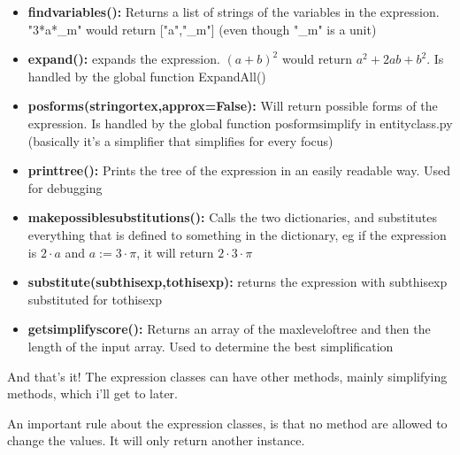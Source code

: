 \documentclass[11pt]{article}
\begin{document}
\begin{itemize}
\item \textbf{findvariables():} Returns a list of strings of the variables in the expression. "3*a*\_m" would return ["a","\_m"] (even though "\_m" is a unit)
\item \textbf{expand():} expands the expression. $(a+b)^2$ would return $a^2+2ab+b^2$. Is handled by the global function ExpandAll()
\item \textbf{posforms(stringortex,approx=False):} Will return possible forms of the expression. Is handled by the global function posformsimplify in entityclass.py (basically it's a simplifier that simplifies for every focus)
\item \textbf{printtree():} Prints the tree of the expression in an easily readable way. Used for debugging
\item \textbf{makepossiblesubstitutions():} Calls the two dictionaries, and substitutes everything that is defined to something in the dictionary, eg if the expression is $2\cdot a$ and $a:=3\cdot \pi$, it will return $2\cdot 3\cdot \pi$
\item \textbf{substitute(subthisexp,tothisexp):} returns the expression with subthisexp substituted for tothisexp
\item \textbf{getsimplifyscore():} Returns an array of the maxleveloftree and then the length of the input array. Used to determine the best simplification

\end{itemize}
And that's it! The expression classes can have other methods, mainly simplifying methods, which i'll get to later.

An important rule about the expression classes, is that no method are allowed to change the values. It will only return another instance.
\end{document}
